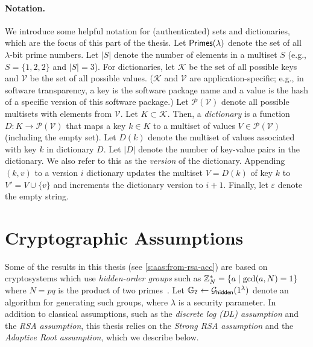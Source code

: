 \paragraph{Notation.}
We introduce some helpful notation for (authenticated) sets and dictionaries, which are the focus of this part of the thesis.
Let $\mathsf{Primes}(\lambda)$ denote the set of all $\lambda$-bit prime numbers.
Let $|S|$ denote the number of elements in a multiset $S$ (e.g., $S=\{1,2,2\}$ and $|S|=3$).
For dictionaries, let $\mathcal{K}$ be the set of all possible keys and $\mathcal{V}$ be the set of all possible values.
($\mathcal{K}$ and $\mathcal{V}$ are application-specific; e.g., in software transparency, a key is the software package name and a value is the hash of a specific version of this software package.)
Let $\mathcal{P}(\mathcal{V})$ denote all possible multisets with elements from $\mathcal{V}$.
Let $K\subset \mathcal{K}$.
Then, a \textit{dictionary} is a function $D : K \rightarrow \mathcal{P}(\mathcal{V})$ that maps a key $k\in K$ to a multiset of values $V\in\mathcal{P}(\mathcal{V})$ (including the empty set).
Let $D(k)$ denote the multiset of values associated with key $k$ in dictionary $D$.
Let $|D|$ denote the number of key-value pairs in the dictionary.
We also refer to this as the \textit{version} of the dictionary.
Appending $(k,v)$ to a version $i$ dictionary updates the multiset $V = D(k)$ of key $k$ to $V' = V \cup \{v\}$ and increments the dictionary version to $i+1$.
Finally, let $\varepsilon$ denote the empty string.

\section{Cryptographic Assumptions}
\label{s:prelim:hidden-order-groups}
Some of the results in this thesis (see \cref{s:aas:from-rsa-acc}) are based on cryptosystems which use \textit{hidden-order groups} such as $\mathbb{Z}_N^*=\{a \mid \gcd(a,N) = 1\}$ where $N=pq$ is the product of two primes~\cite{rsa}.
Let $\mathbb{G}_{\textbf{?}} \leftarrow \mathcal{G}_{\mathsf{hidden}}(1^\lambda)$ denote an algorithm for generating such groups, where $\lambda$ is a security parameter.
In addition to classical assumptions, such as the \textit{discrete log (DL) assumption} and the \textit{RSA assumption}, this thesis relies on the \textit{Strong RSA assumption} and the \textit{Adaptive Root assumption}, which we describe below.

